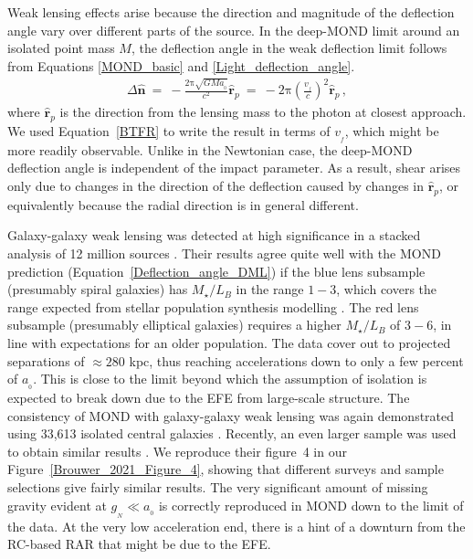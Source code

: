 \documentclass[fleqn,usenatbib,useAMS,onecolumn]{mnras} %
\begin{document}
Weak lensing effects arise because the direction and magnitude of the deflection angle vary over different parts of the source. In the deep-MOND limit around an isolated point mass $M$, the deflection angle in the weak deflection limit follows from Equations \ref{MOND_basic} and \ref {Light_deflection_angle}.
\begin{eqnarray}
	\Delta \widehat{\bm{n}} ~=~ -\frac{2\mathrm{\pi}\sqrt{GMa_{_0}}}{c^2} \widehat{\bm{r}}_p ~=~ -2\mathrm{\pi} \left( \frac{v_{_f}}{c}\right)^2 \widehat{\bm{r}}_p \, ,
	\label{Deflection_angle_DML}
\end{eqnarray}
where $\widehat{\bm{r}}_p$ is the direction from the lensing mass to the photon at closest approach. We used Equation~\ref{BTFR} to write the result in terms of $v_{_f}$, which might be more readily observable. Unlike in the Newtonian case, the deep-MOND deflection angle is independent of the impact parameter. As a result, shear arises only due to changes in the direction of the deflection caused by changes in $\widehat{\bm{r}}_p$, or equivalently because the radial direction is in general different.

Galaxy-galaxy weak lensing was detected at high significance in a stacked analysis of 12 million sources \citep{Brimioulle_2013}. Their results agree quite well with the MOND prediction (Equation~\ref{Deflection_angle_DML}) if the blue lens subsample (presumably spiral galaxies) has $M_{\star}/L_B$ in the range $1-3$, which covers the range expected from stellar population synthesis modelling \citep{Milgrom_2013}. The red lens subsample (presumably elliptical galaxies) requires a higher $M_{\star}/L_B$ of $3-6$, in line with expectations for an older population. The data cover out to projected separations of $\approx 280$ kpc, thus reaching accelerations down to only a few percent of $a_{_0}$. This is close to the limit beyond which the assumption of isolation is expected to break down due to the EFE from large-scale structure. The consistency of MOND with galaxy-galaxy weak lensing was again demonstrated using 33,613 isolated central galaxies \citep{Brouwer_2017}. Recently, an even larger sample was used to obtain similar results \citep{Brouwer_2021}. We reproduce their figure~4 in our Figure~\ref{Brouwer_2021_Figure_4}, showing that different surveys and sample selections give fairly similar results. The very significant amount of missing gravity evident at $g_{_N} \ll a_{_0}$ is correctly reproduced in MOND down to the limit of the data. At the very low acceleration end, there is a hint of a downturn from the RC-based RAR that might be due to the EFE.
\end{document}
